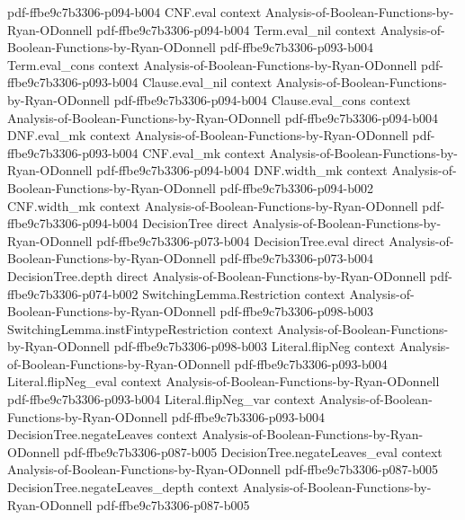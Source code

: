 \begin{theorem}
  {pdf-ffbe9c7b3306-p094-b004}
\proofstep
  {CNF.eval}
  {context}
  {Analysis-of-Boolean-Functions-by-Ryan-ODonnell}
  {pdf-ffbe9c7b3306-p094-b004}
\proofstep
  {Term.eval_nil}
  {context}
  {Analysis-of-Boolean-Functions-by-Ryan-ODonnell}
  {pdf-ffbe9c7b3306-p093-b004}
\proofstep
  {Term.eval_cons}
  {context}
  {Analysis-of-Boolean-Functions-by-Ryan-ODonnell}
  {pdf-ffbe9c7b3306-p093-b004}
\proofstep
  {Clause.eval_nil}
  {context}
  {Analysis-of-Boolean-Functions-by-Ryan-ODonnell}
  {pdf-ffbe9c7b3306-p094-b004}
\proofstep
  {Clause.eval_cons}
  {context}
  {Analysis-of-Boolean-Functions-by-Ryan-ODonnell}
  {pdf-ffbe9c7b3306-p094-b004}
\proofstep
  {DNF.eval_mk}
  {context}
  {Analysis-of-Boolean-Functions-by-Ryan-ODonnell}
  {pdf-ffbe9c7b3306-p093-b004}
\proofstep
  {CNF.eval_mk}
  {context}
  {Analysis-of-Boolean-Functions-by-Ryan-ODonnell}
  {pdf-ffbe9c7b3306-p094-b004}
\proofstep
  {DNF.width_mk}
  {context}
  {Analysis-of-Boolean-Functions-by-Ryan-ODonnell}
  {pdf-ffbe9c7b3306-p094-b002}
\proofstep
  {CNF.width_mk}
  {context}
  {Analysis-of-Boolean-Functions-by-Ryan-ODonnell}
  {pdf-ffbe9c7b3306-p094-b004}
\proofstep
  {DecisionTree}
  {direct}
  {Analysis-of-Boolean-Functions-by-Ryan-ODonnell}
  {pdf-ffbe9c7b3306-p073-b004}
\proofstep
  {DecisionTree.eval}
  {direct}
  {Analysis-of-Boolean-Functions-by-Ryan-ODonnell}
  {pdf-ffbe9c7b3306-p073-b004}
\proofstep
  {DecisionTree.depth}
  {direct}
  {Analysis-of-Boolean-Functions-by-Ryan-ODonnell}
  {pdf-ffbe9c7b3306-p074-b002}
\proofstep
  {SwitchingLemma.Restriction}
  {context}
  {Analysis-of-Boolean-Functions-by-Ryan-ODonnell}
  {pdf-ffbe9c7b3306-p098-b003}
\proofstep
  {SwitchingLemma.instFintypeRestriction}
  {context}
  {Analysis-of-Boolean-Functions-by-Ryan-ODonnell}
  {pdf-ffbe9c7b3306-p098-b003}
\proofstep
  {Literal.flipNeg}
  {context}
  {Analysis-of-Boolean-Functions-by-Ryan-ODonnell}
  {pdf-ffbe9c7b3306-p093-b004}
\proofstep
  {Literal.flipNeg_eval}
  {context}
  {Analysis-of-Boolean-Functions-by-Ryan-ODonnell}
  {pdf-ffbe9c7b3306-p093-b004}
\proofstep
  {Literal.flipNeg_var}
  {context}
  {Analysis-of-Boolean-Functions-by-Ryan-ODonnell}
  {pdf-ffbe9c7b3306-p093-b004}
\proofstep
  {DecisionTree.negateLeaves}
  {context}
  {Analysis-of-Boolean-Functions-by-Ryan-ODonnell}
  {pdf-ffbe9c7b3306-p087-b005}
\proofstep
  {DecisionTree.negateLeaves_eval}
  {context}
  {Analysis-of-Boolean-Functions-by-Ryan-ODonnell}
  {pdf-ffbe9c7b3306-p087-b005}
\proofstep
  {DecisionTree.negateLeaves_depth}
  {context}
  {Analysis-of-Boolean-Functions-by-Ryan-ODonnell}
  {pdf-ffbe9c7b3306-p087-b005}
\proofstep

\end{theorem}
